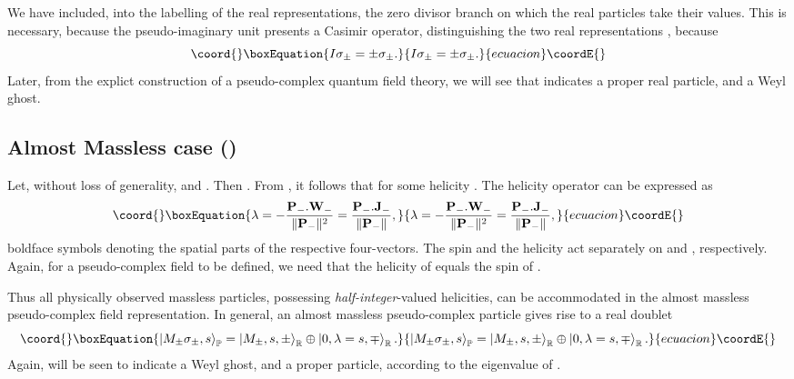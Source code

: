 \documentclass[a4paper,aps,prd,showkeys,showpacs,superscriptaddress,preprint]{revtex4}
\providecommand{\pc}{\mathbb{P}}
\providecommand{\reals}{\mathbb{R}}
\begin{document}
We have included, into the labelling of the real representations,
the zero divisor branch on which the real particles take their
values. This is necessary, because the pseudo-imaginary unit \coordHE{} presents a
Casimir operator, distinguishing the two real representations
\myHighlight{$\sigma_\pm \mathcal{P}_\reals$}\coordHE{}, because
\begin{equation}\coord{}\boxEquation{
  I \sigma_\pm = \pm \sigma_\pm.
}{
  I \sigma_\pm = \pm \sigma_\pm.
}{ecuacion}\coordE{}\end{equation}
Later, from the explict construction of a pseudo-complex quantum field
theory, we will see that \myHighlight{$\left|+\right>$}\coordHE{} indicates a proper real particle, and \myHighlight{$\left|-\right>$}\coordHE{} a
Weyl ghost. 
 
\subsection{Almost Massless case (\myHighlight{$0 \neq M^2 \in \pc^0$}\coordHE{})}
Let, without loss of generality, \coordHE{} and \coordHE{}. Then \coordHE{}. From \coordHE{}, it
follows that \coordHE{} for some helicity \myHighlight{$\lambda \in
\reals$}\coordHE{}. The helicity operator can be expressed as
\begin{equation}\coord{}\boxEquation{
  \lambda = - \frac{\mathbf{P}_- .\mathbf{W}_-}{\|\mathbf{P}_-\|^2} =
  \frac{\mathbf{P}_-.\mathbf{J}_-}{\|\mathbf{P}_-\|},
}{
  \lambda = - \frac{\mathbf{P}_- .\mathbf{W}_-}{\|\mathbf{P}_-\|^2} =
  \frac{\mathbf{P}_-.\mathbf{J}_-}{\|\mathbf{P}_-\|},
}{ecuacion}\coordE{}\end{equation}
boldface symbols denoting the spatial parts of the respective four-vectors.  
The spin \coordHE{} and the helicity \myHighlight{$\lambda$}\coordHE{} act separately on \myHighlight{$\phi_+$}\coordHE{}
and \myHighlight{$\phi_-$}\coordHE{}, respectively. Again, for a pseudo-complex field \myHighlight{$\phi$}\coordHE{}
to be defined, we need that the helicity of \myHighlight{$\phi_-$}\coordHE{} equals the spin
of \myHighlight{$\phi_+$}\coordHE{}. 

Thus all physically observed massless particles, possessing
\textsl{half-integer}-valued helicities, can be accommodated in the almost
massless pseudo-complex field representation.
In general, an almost massless pseudo-complex particle gives rise to a
real doublet
\begin{equation}\coord{}\boxEquation{
  \left|M_\pm\sigma_\pm, s\right>_\pc = \left|M_\pm, s, \pm\right>_\reals \oplus \left|0, \lambda=s, \mp\right>_\reals.
}{
  \left|M_\pm\sigma_\pm, s\right>_\pc = \left|M_\pm, s, \pm\right>_\reals \oplus \left|0, \lambda=s, \mp\right>_\reals.
}{ecuacion}\coordE{}\end{equation}
Again, \myHighlight{$\left|-\right>$}\coordHE{} will be seen to indicate a Weyl ghost, and \myHighlight{$\left|+\right>$}\coordHE{} a proper
particle, according to the eigenvalue \coordHE{} of \coordHE{}.
\end{document}
